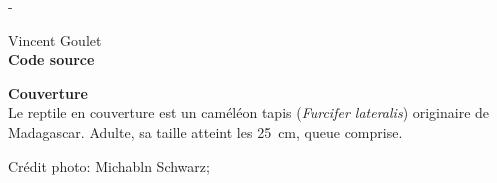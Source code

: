 
\begingroup
\calccentering{\unitlength}
\begin{adjustwidth*}{\unitlength}{-\unitlength}
  \setlength{\parindent}{0pt}
  \setlength{\parskip}{\baselineskip}

  {\textcopyright} {\year} Vincent Goulet \\

  

  \textbf{Code source} \\
  \viewsource{\ghurl}

  \textbf{Couverture} \\
  Le reptile en couverture est un caméléon tapis (\emph{Furcifer
    lateralis}) originaire de Madagascar. Adulte, sa taille atteint
  les 25~cm, queue comprise.

  Crédit photo: Michabln Schwarz; 
\end{adjustwidth*}
\endgroup

